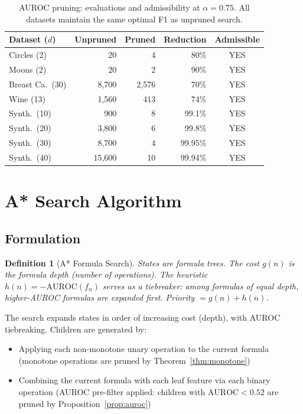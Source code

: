 \documentclass[journal]{IEEEtran}
\newtheorem{definition}{Definition}
\begin{document}
\begin{table}[h]
\caption{AUROC pruning: evaluations and admissibility at $\alpha = 0.75$.
All datasets maintain the same optimal F1 as unpruned search.}
\label{tab:auroc}
\scriptsize
\begin{tabular}{@{}lrrrc@{}}
\toprule
Dataset ($d$) & Unpruned & Pruned & Reduction & Admissible \\
\midrule
Circles (2) & 20 & 4 & 80\% & YES \\
Moons (2) & 20 & 2 & 90\% & YES \\
Breast Ca.\ (30) & 8{,}700 & 2{,}576 & 70\% & YES \\
Wine (13) & 1{,}560 & 413 & 74\% & YES \\
Synth.\ (10) & 900 & 8 & 99.1\% & YES \\
Synth.\ (20) & 3{,}800 & 6 & 99.8\% & YES \\
Synth.\ (30) & 8{,}700 & 4 & 99.95\% & YES \\
Synth.\ (40) & 15{,}600 & 10 & 99.94\% & YES \\
\bottomrule
\end{tabular}
\end{table}

\section{A* Search Algorithm}

\subsection{Formulation}

\begin{definition}[A* Formula Search]
States are formula trees. The cost $g(n)$ is the formula depth
(number of operations). The heuristic $h(n) = -\mathrm{AUROC}(f_n)$
serves as a tiebreaker: among formulas of equal depth, higher-AUROC
formulas are expanded first. Priority $= g(n) + h(n)$.
\end{definition}

The search expands states in order of increasing cost (depth), with
AUROC tiebreaking. Children are generated by:
\begin{itemize}
\item Applying each non-monotone unary operation to the current formula
(monotone operations are pruned by Theorem~\ref{thm:monotone})
\item Combining the current formula with each leaf feature via each
binary operation (AUROC pre-filter applied: children with
$\mathrm{AUROC} < 0.52$ are pruned by Proposition~\ref{prop:auroc})
\end{itemize}
\end{document}
